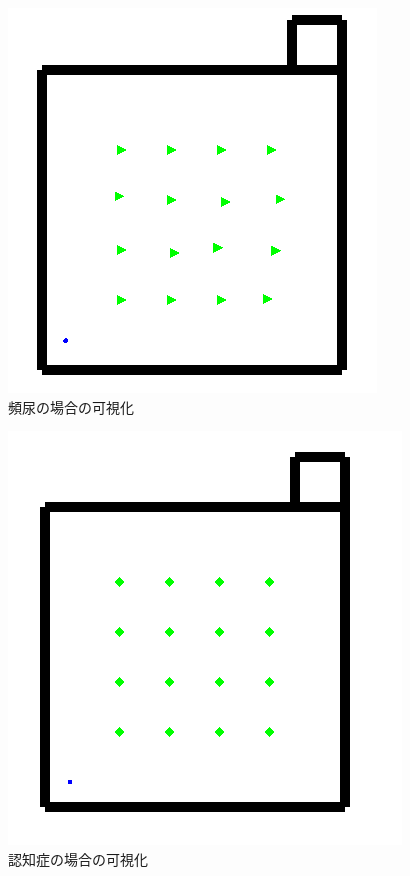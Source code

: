 \begin{figure}[htb]
\begin{center}
 \includegraphics[scale=0.6]{figures/elderly_v2.png}
 \caption[頻尿の場合の可視化]{頻尿の場合の可視化 \label{elderly_v2}}
\end{center}
\end{figure}

\begin{figure}[htb]
\begin{center}
 \includegraphics[scale=0.6]{figures/elderly_v3.png}
 \caption[認知症の場合の可視化]{認知症の場合の可視化 \label{elderly_v3}}
\end{center}
\end{figure}


